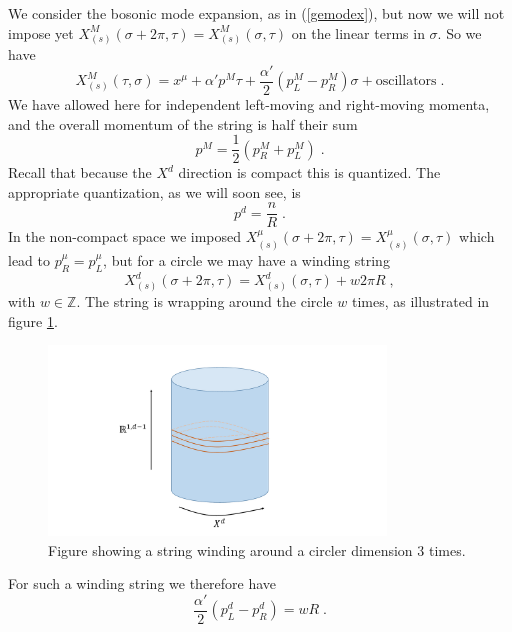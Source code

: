 \documentclass[11pt,a4paper]{article}
\numberwithin{equation}{section}
\numberwithin{table}{section}\setlength{\multlinegap}{25pt}
\newcommand{\be}{\begin{equation}}
\newcommand{\ee}{\end{equation}}
\begin{document}
We consider the bosonic mode expansion, as in (\ref{gemodex}), but now we will not impose yet $X_{(s)}^{M}\left(\sigma+2\pi,\tau \right) = X_{(s)}^{M}\left(\sigma,\tau \right)$ on the linear terms in $\sigma$. So we have
\be
X_{(s)}^{M}\left(\tau,\sigma\right) = x^{\mu} +\alpha' p^{M} \tau + \frac{\alpha'}{2}\left(p^{M}_L - p^{M}_R \right) \sigma + \mathrm{oscillators} \;.
\ee
We have allowed here for independent left-moving and right-moving momenta, and the overall momentum of the string is half their sum
\be
p^{M} = \frac12 \left( p^{M}_R + p^{M}_L \right)\;.
\ee
Recall that because the $X^d$ direction is compact this is quantized. The appropriate quantization, as we will soon see, is
\be
p^d = \frac{n}{R} \;.
\ee
In the non-compact space we imposed $X_{(s)}^{\mu}\left(\sigma+2\pi,\tau \right) = X_{(s)}^{\mu}\left(\sigma,\tau \right)$ which lead to $p^{\mu}_R=p^{\mu}_L$, but for a circle we may have a winding string
\be
X_{(s)}^{d}\left(\sigma+2\pi,\tau \right) = X_{(s)}^{d}\left(\sigma,\tau \right) + w 2 \pi R \;,
\ee
with $w \in \mathbb{Z}$. The string is wrapping around the circle $w$ times, as illustrated in figure \ref{fig:wi}. 
\begin{figure}[t]
\centering
 \includegraphics[width=0.8\textwidth]{Figwi.pdf}
\caption{Figure showing a string winding around a circler dimension 3 times.}
\label{fig:wi}
\end{figure}
For such a winding string we therefore have
\be
\frac{\alpha'}{2}\left(p_L^d - p_R^d\right) = w R \;.
\ee
\end{document}

